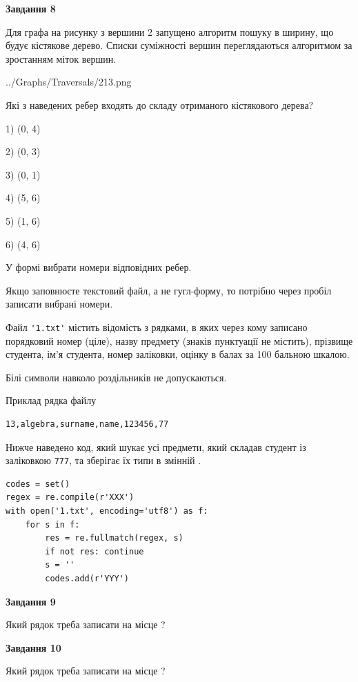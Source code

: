 \documentclass[12pt, ukrainian]{article}
\def\code#1{\Verb!#1!}
\begin{document}
{\begin {large}
{\begin {center}\textbf{Завдання 8}\end {center}}\par
Для графа на рисунку з вершини 2 запущено алгоритм пошуку в ширину, що будує кістякове дерево. Списки суміжності вершин переглядаються алгоритмом за зростанням міток вершин.\par
\begin{center}
	{../Graphs/Traversals/213.png}
\end{center}
\par Які з наведених ребер входять до складу отриманого кістякового дерева?\par
1) (0, 4)\par
2) (0, 3)\par
3) (0, 1)\par
4) (5, 6)\par
5) (1, 6)\par
6) (4, 6)\par
{\vskip 15pt} У формі вибрати номери відповідних ребер.


Якщо заповнюєте текстовий файл, а не гугл-форму, то потрібно через пробіл записа\-ти вибрані номери.\par
\newpage


Файл \code{'1.txt'} містить відомість з рядками, в яких через кому записано поряд\-ковий номер (ціле), назву предмету (знаків пунктуації не містить), прізвище студента, ім'я студента, номер заліковки, оцінку в балах за 100 бальною шкалою.

Білі символи навколо роздільників не допускаються.

Приклад рядка файлу



\begin{verbatim}
13,algebra,surname,name,123456,77
\end{verbatim}


Нижче наведено код, який шукає усі предмети, який складав студент із заліковкою \code{777}, та зберігає їх типи в змінній .



\begin{verbatim}
codes = set()
regex = re.compile(r'XXX')
with open('1.txt', encoding='utf8') as f:
    for s in f:
        res = re.fullmatch(regex, s)
        if not res: continue
        s = ''
        codes.add(r'YYY')
\end{verbatim}


{\begin {center}\textbf{Завдання 9}\end {center}}\par
Який рядок треба записати на місце  ?\par
\vspace{5mm}


{\begin {center}\textbf{Завдання 10}\end {center}}\par
Який рядок треба записати на місце  ?\par


\newpage


\end {large}}
\end{document}
